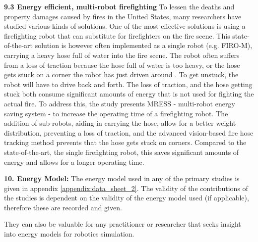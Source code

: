 \vspace{2mm} \noindent \textbf{9.3 Energy efficient, multi-robot firefighting}
To lessen the deaths \cite{fahy2015firefighter_deaths} and property damages \cite{karter2013fire_damages} 
caused by fires in the United States, many researchers have studied various kinds of solutions. 
One of the most effective solutions is using a firefighting robot that can 
substitute for firefighters on the fire scene. This state-of-the-art solution
is however often implemented as a single robot (e.g. FIRO-M), 
carrying a heavy hose full of water into the fire scene.
The robot often suffers from a loss of traction because the hose full of water
is too heavy, or the hose gets stuck on a corner the robot has just driven around \cite{kim2016firefighting_robot}.
To get unstuck, the robot will have to drive back and forth. 
The loss of traction, and the hose getting stuck both consume significant amounts of
energy that is not used for fighting the actual fire.
To address this, the study presents MRESS - multi-robot energy saving system - to increase
the operating time of a firefighting robot.
The addition of sub-robots, aiding in carrying the hose, 
allow for a better weight distribution, preventing a loss of traction, 
and the advanced vision-based fire hose tracking method prevents 
that the hose gets stuck on corners.
Compared to the state-of-the-art, the single firefighting robot, 
this saves significant amounts of energy and allows for a longer operating time.

\newpage

\noindent\textbf{10. Energy Model:}
The energy model used in any of the primary studies is given in appendix \ref{appendix:data_sheet_2}.
The validity of the contributions of the studies is dependent on the validity of the energy model used (if applicable), 
therefore these are recorded and given.

\vspace{2mm}

They can also be valuable for any practitioner or researcher that seeks insight into energy models for robotics simulation.

\vspace{8mm}


